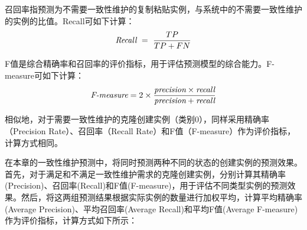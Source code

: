 召回率指预测为不需要一致性维护的复制粘贴实例，与系统中的不需要一致性维护的实例的比值。Recall可如下计算：
\begin{equation} 
\mbox{\it Recall}~=~{\frac {TP}{TP+FN}}
 \end{equation}

F值是综合精确率和召回率的评价指标，用于评估预测模型的综合能力。F-measure可如下计算：
\begin{equation} 
\mbox{\it F-measure} =2 \times {\frac {\mbox{\it precision} \times \mbox{\it recall} }{ \mbox{\it precision} + \mbox{\it recall} } }
 \end{equation}


相似地，对于需要一致性维护的克隆创建实例（类别$0$），同样采用精确率（Precision Rate）、召回率（Recall Rate）和F值（F-measure）作为评价指标，计算方式相同。

在本章的一致性维护预测中，将同时预测两种不同的状态的创建实例的预测效果。首先，对于满足和不满足一致性维护需求的克隆创建实例，分别计算其精确率(Precision)、召回率(Recall)和F值(F-measure)，用于评估不同类型实例的预测效果。然后，将这两组预测结果根据实际实例的数量进行加权平均，计算平均精确率(Average Precision)、平均召回率(Average Recall)和平均F值(Average F-measure)作为评价指标，计算方式如下所示：

